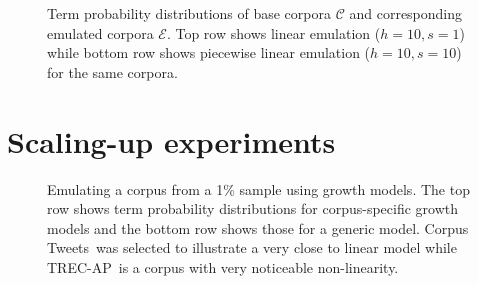 \documentclass[11pt]{report}
\newcommand{\script}[1]{$\mathcal{#1}$}
\newcommand{\TRECAP}{TREC-AP}
\newcommand{\AcademicID}{Academic paper titles}
\newcommand{\clueWebTitles}{ClueWeb12 titles}
\newcommand{\Tweets}{Tweets}
\newcommand{\PP}{Imagefiles}
\begin{document}
 
\begin{figure}
\centering

\caption{Term probability
  distributions of base corpora \script{C} and corresponding emulated
  corpora \script{E}.  Top row shows linear emulation ($h=10, s=1$)
  while bottom row shows piecewise linear emulation ($h=10, s=10$)
  for the same corpora. \label{emulation} }
\end{figure}



\chapter{Scaling-up experiments}  %
\label{SUExpts}

\begin{figure}[!ht]
\centering

\caption{Emulating a corpus from a 1\% sample using growth models.
  The top row shows term probability distributions for corpus-specific 
  growth models and the bottom row shows those for a generic model. 
  Corpus \Tweets~was selected to illustrate a very close to linear 
  model while \TRECAP~is a corpus with very noticeable non-linearity.  \label{1-100}}
\end{figure}
\end{document}
